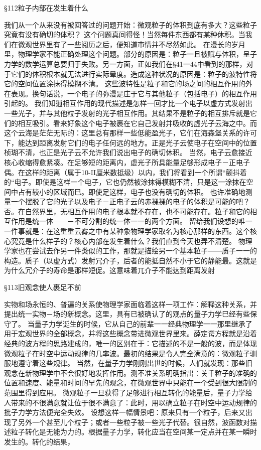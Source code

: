 §112粒子内部在发生着什么

我们从一个从来没有被回答过的问题开始：微观粒子的体积到底有多大？这些粒子究竟有没有确切的体积？
这个问题真间得怪！当然每件东西都有某种休积。当我们在微观世界里有了一些阅历之后，便知道市情并不尽然如此。
在漫长的岁月里，物理学家不能正确处理这个问题。部分的原因是：粒子一且被赋与体积，呈子力学的数学运算总要归于失败。另一方面，正如我们在§41一44中看到的那样，对于它们的体积根本就无法进行实际晕度。造成这种状况的原因是：粒子的波特性将它的空间位置涂抹得模糊不清。
这些波特性是粒子和它的场之间的相互作用的外在表现。换句话说，一个电子的弥漫是庄于它与其他粒子（包括电子）的相互作用引起的。
我们知逍相互作用的现代描述是怎样一回才比一个电子以虚方式发射出一些光子，并与其他粒子发射的光子相互作用。其结果不是粒子的相互排斥就是它们的相互吸引。看来好象这个电子被裹在它自己发射并吸收的虚光子云海之中。而这个云海是茫茫无际的：这里总有那样一些低能盈光子，它们在海森堡关系的许可下，能达到距离发射它们的电子任何远的地方。正是光子云使电子在空间中的位置桢瑚不清，也正是光子云不允许我们说出电子的确切休积。
当然，电子云愈接近核心收缩得愈紧凑。在足够短的距离内，虚光子所具能量足够形成电子－正电子偶。在这样的距离（属于10-II厘米数抵级）以内，我们将看到一个所谓“颤抖着的“电子。即使是这样一个电子，它也仍然被涂抹得模糊不清，只是这一涂抹在空间中占有较小的区域而巳。即使足这样，电子也没有确切的体积。
也许准确地测量一个摆脱了它的光子以及电子－正电子云的赤裸裸的电子的体积是可能的吧？否。在自然界里，无相互作用的电子根本就不存在，也不可能存在。粒子和它的相互作用是统一体——－不可分割的统一体一一的两个方面。
留给我们设想的唯一一件事就是：在这重重云雾之中有某种象物理学家取名为核心那样的东西。这个核心究竟是什么样子的？核心内部在发生着什么？我们直到今天也弄不清楚。
物理学家也在尝试去作另一件类似的工作，那就是描绘另一个基本粒子——质子一一的构造。质子（以虚方式）发射冗介子，后者的能抵自然不小于它的静能最。这就是为什么冗介子的寿命是那样短促。这意味着兀介子不能达到距离发射


§113旧观念使人裹足不前

实物和场永恒的、普遍的关系使物理学家面临着这样一项工作：解释这种关系，并提出统一实物－场的新概念。这里，具有已被确认了的观点的量子力学巳经有些保守了。
当量子力学诞生的时候，它从自己的前辈一一经典物理学一一那里继承了用于宏观世界的全部概念，并将这些概念带进微观世界里来。薛定谔方程就是沿着经典的波方程的思路建成的，唯一的区别在于：它描述的不是一般的波，而是体现微观粒子在时空中运动规律的几率波。最初的结果是令人完全满意的：微观粒子驯服地遵守着这些规律。
当然，在量子力学刚刚出世的时候，人们就发现：那些旧观念在新物理学中不会很好地发挥作用。测不准关系明确指出：关千粒子的准确的位置和速度、能量和时间的早先的观念，在微观世界中只能在一个受到很大限制的范围里得到应用。
微观粒子一旦获得了足够进行相互转化的能量后，量子力学给人带来的不很满意就让位于很不满意了：此时，用以确立粒子在时空中运动规律的批子力学方法便完全失效。
设想这样一幅情景吧：原来只有一个粒子，后来又出现了另外一个甚至儿个粒子；或者一些粒子被一些光子代替。很自然，波函数对描述粒子转化是无能为力的。根据量子力学，转化应当在空间某一定点并在某一瞬时发生的。转化的结果，

